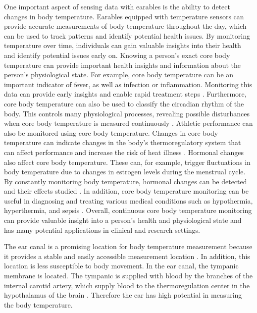 One important aspect of sensing data with earables is the ability to detect changes in body temperature. 
Earables equipped with temperature sensors can provide accurate measurements of body temperature throughout the day, which can be used to track patterns and identify potential health issues. 
By monitoring temperature over time, individuals can gain valuable insights into their health and identify potential issues early on.
Knowing a person's exact core body temperature can provide important health insights and information about the person's physiological state.
For example, core body temperature can be an important indicator of fever, as well as infection or inflammation. 
Monitoring this data can provide early insights and enable rapid treatment steps \cite{NovelWearableDevice2021}.
Furthermore, core body temperature can also be used to classify the circadian rhythm of the body. 
This controls many physiological processes, revealing possible disturbances when core body temperature is measured continuously \cite{liCircadianRhythmAnalysis2021, juSleepQualityPreclinical2013}.
Athletic performance can also be monitored using core body temperature. Changes in core body temperature can indicate changes in the body's thermoregulatory system that can affect performance and increase the risk of heat illness \cite{gabbettAthleteMonitoringCycle2017, silvaSleepQualityTraining2022}.
Hormonal changes also affect core body temperature. 
These can, for example, trigger fluctuations in body temperature due to changes in estrogen levels during the menstrual cycle. 
By constantly monitoring body temperature, hormonal changes can be detected and their effects studied \cite{goeckenjanContinuousBodyTemperature2020, charkoudianAutonomicControlBody2017, hamataniEstimatingCoreBody2015}.
In addition, core body temperature monitoring can be useful in diagnosing and treating various medical conditions such as hypothermia, hyperthermia, and sepsis \cite{hardingTemperatureDependenceSleep2019, Doi101016, raymannSkinDeepEnhanced2008}.
Overall, continuous core body temperature monitoring can provide valuable insight into a person's health and physiological state and has many potential applications in clinical and research settings.

The ear canal is a promising location for body temperature measurement because it provides a stable and easily accessible measurement location \cite{ericksonComparisonEarbasedBladder1993}.
In addition, this location is less susceptible to body movement. 
In the ear canal, the tympanic membrane is located.
The tympanic is supplied with blood by the branches of the internal carotid artery, which supply blood to the thermoregulation center in the hypothalamus of the brain \cite{moranCoreTemperatureMeasurement2002a}.
Therefore the ear has high potential in measuring the body temperature.

